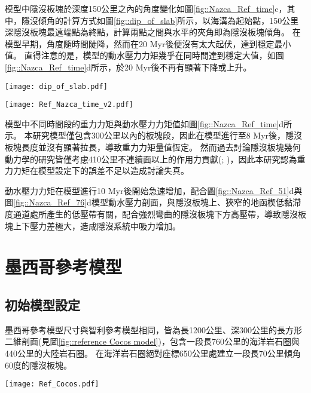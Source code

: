 模型中隱沒板塊於深度150公里之內的角度變化如圖\ref{fig::Nazca_Ref_time}c，其中，隱沒傾角的計算方式如圖\ref{fig::dip_of_slab}所示，以海溝為起始點，150公里深隱沒板塊最遠端點為終點，計算兩點之間與水平的夾角即為隱沒板塊傾角。
在模型早期，角度隨時間陡降，然而在20 Myr後便沒有太大起伏，達到穩定最小值。
直得注意的是，模型的動水壓力力矩幾乎在同時間達到穩定大值，如圖\ref{fig::Nazca_Ref_time}d所示，於20 Myr後不再有顯著下降或上升。

\begin{figure*}[h]
    \centering
    \texttt{[image: dip\_of\_slab.pdf]}
    \caption[本研究中隱沒傾角的計算方式]{本研究中隱沒傾角的計算方式。}
    \label{fig::dip_of_slab}
\end{figure*}

\begin{figure*}[ht!]
    \centering
    \texttt{[image: Ref\_Nazca\_time\_v2.pdf]}
    \caption[智利參考模型隱沒板塊狀態隨時間變化]{智利參考模型隱沒板塊狀態隨時間變化。}
    \label{fig::Nazca_Ref_time}
\end{figure*}

模型中不同時間段的重力力矩與動水壓力力矩值如圖\ref{fig::Nazca_Ref_time}d所示。
本研究模型僅包含300公里以內的板塊段，因此在模型進行至8 Myr後，隱沒板塊長度並沒有顯著拉長，導致重力力矩量值恆定。
然而過去討論隱沒板塊幾何動力學的研究皆僅考慮410公里不連續面以上的作用力貢獻(\citealp{schellart2004quantifying}; \citealp{billen2008modeling})，因此本研究認為重力力矩在模型設定下的誤差不足以造成討論失真。

動水壓力力矩在模型進行10 Myr後開始急速增加，配合圖\ref{fig::Nazca_Ref_51}d與圖\ref{fig::Nazca_Ref_76}d模型動水壓力剖面，與隱沒板塊上、狹窄的地函楔低黏滯度通道處所產生的低壓帶有關，配合強烈彎曲的隱沒板塊下方高壓帶，導致隱沒板塊上下壓力差極大，造成隱沒系統中吸力增加。

\newpage
\section{墨西哥參考模型}
\subsection{初始模型設定}
墨西哥參考模型尺寸與智利參考模型相同，皆為長1200公里、深300公里的長方形二維剖面(見圖\ref{fig::reference Cocos model})，包含一段長760公里的海洋岩石圈與440公里的大陸岩石圈。
在海洋岩石圈絕對座標650公里處建立一段長70公里傾角60度的隱沒板塊。
\begin{figure*}[ht!]
    \centering
    \texttt{[image: Ref\_Cocos.pdf]}
    \caption[墨西哥參考模型設計與邊界條件示意圖]{墨西哥參考模型設計與邊界條件示意圖}
    \label{fig::reference Cocos model}
\end{figure*}

